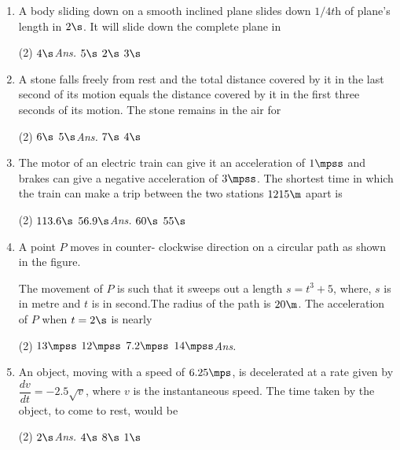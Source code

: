 \documentclass{article}
\newcommand{\ans}{\textcolor{red!95}{\textit{\quad Ans.}}}
\begin{document}
\begin{enumerate}
	\item A body sliding down on a smooth inclined plane slides down $1/4\textit{th}$ of plane's length in $2 \s$. It will slide down the complete plane in
	\begin{tasks}(2)
		\task $4\s$\ans
		\task $5\s$
		\task $2\s$
		\task $3\s$
	\end{tasks}
	
	
	\item A stone falls freely from rest and the total distance covered by it in the last second of its motion equals the distance covered by it in the first three seconds of its motion. The stone remains in the air for
	\begin{tasks}(2)
		\task $6\s$
		\task $5\s$\ans
		\task $7\s$
		\task $4\s$
	\end{tasks}
	
	
	\item The motor of an electric train can give it an acceleration of $1\mpss$ and brakes can give a negative acceleration of $3 \mpss$. The shortest time in which the train can make a trip between the two stations $1215 \m$ apart is
	\begin{tasks}(2)
		\task $113.6\s$
		\task $56.9\s$\ans
		\task $60\s$
		\task $55\s$
	\end{tasks}
	
	
	\item A point $P$ moves in counter- clockwise direction on a
circular path as shown in the figure.
	\begin{center}
	\end{center}
The movement of $P$ is such that it sweeps out a length $s =t^3 + 5$, where, $s$ is in metre and $t$ is in second.The radius of the path is $20\m$. The acceleration of $P$ when $t = 2\s$ is nearly
	\begin{tasks}(2)
		\task $13\mpss$
		\task $12\mpss$
		\task $7.2\mpss$
		\task $14\mpss$\ans
	\end{tasks}
	
	\item An object, moving with a speed of $6.25\mps$, is decelerated at a rate given by $\dfrac{dv}{dt}=-2.5\sqrt{v}$, where $v$ is the instantaneous speed. The time taken by the object, to come to rest, would be
	\begin{tasks}(2)
		\task $2\s$\ans
		\task $4\s$
		\task $8\s$
		\task $1\s$
	\end{tasks}
	

\end{enumerate}
\end{document}
